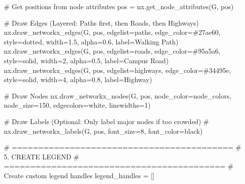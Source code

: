 \documentclass[
  letterpaper,
  DIV=11,
  numbers=noendperiod]{scrreprt}
\newenvironment{Shaded}{\begin{snugshade}}{\end{snugshade}}
\newcommand{\CommentTok}[1]{\textcolor[rgb]{0.37,0.37,0.37}{#1}}
\newcommand{\DecValTok}[1]{\textcolor[rgb]{0.68,0.00,0.00}{#1}}
\newcommand{\FloatTok}[1]{\textcolor[rgb]{0.68,0.00,0.00}{#1}}
\newcommand{\NormalTok}[1]{\textcolor[rgb]{0.00,0.23,0.31}{#1}}
\newcommand{\OperatorTok}[1]{\textcolor[rgb]{0.37,0.37,0.37}{#1}}
\newcommand{\StringTok}[1]{\textcolor[rgb]{0.13,0.47,0.30}{#1}}
\begin{document}
\begin{Shaded}
\begin{Highlighting}[]
\CommentTok{\# Get positions from node attributes}
\NormalTok{pos }\OperatorTok{=}\NormalTok{ nx.get\_node\_attributes(G, }\StringTok{\textquotesingle{}pos\textquotesingle{}}\NormalTok{)}

\CommentTok{\# Draw Edges (Layered: Paths first, then Roads, then Highways)}
\NormalTok{nx.draw\_networkx\_edges(G, pos, edgelist}\OperatorTok{=}\NormalTok{paths, edge\_color}\OperatorTok{=}\StringTok{\textquotesingle{}\#27ae60\textquotesingle{}}\NormalTok{, style}\OperatorTok{=}\StringTok{\textquotesingle{}dotted\textquotesingle{}}\NormalTok{, width}\OperatorTok{=}\FloatTok{1.5}\NormalTok{, alpha}\OperatorTok{=}\FloatTok{0.6}\NormalTok{, label}\OperatorTok{=}\StringTok{\textquotesingle{}Walking Path\textquotesingle{}}\NormalTok{)}
\NormalTok{nx.draw\_networkx\_edges(G, pos, edgelist}\OperatorTok{=}\NormalTok{roads, edge\_color}\OperatorTok{=}\StringTok{\textquotesingle{}\#95a5a6\textquotesingle{}}\NormalTok{, style}\OperatorTok{=}\StringTok{\textquotesingle{}solid\textquotesingle{}}\NormalTok{, width}\OperatorTok{=}\DecValTok{2}\NormalTok{, alpha}\OperatorTok{=}\FloatTok{0.5}\NormalTok{, label}\OperatorTok{=}\StringTok{\textquotesingle{}Campus Road\textquotesingle{}}\NormalTok{)}
\NormalTok{nx.draw\_networkx\_edges(G, pos, edgelist}\OperatorTok{=}\NormalTok{highways, edge\_color}\OperatorTok{=}\StringTok{\textquotesingle{}\#34495e\textquotesingle{}}\NormalTok{, style}\OperatorTok{=}\StringTok{\textquotesingle{}solid\textquotesingle{}}\NormalTok{, width}\OperatorTok{=}\DecValTok{4}\NormalTok{, alpha}\OperatorTok{=}\FloatTok{0.8}\NormalTok{, label}\OperatorTok{=}\StringTok{\textquotesingle{}Highway\textquotesingle{}}\NormalTok{)}

\CommentTok{\# Draw Nodes}
\NormalTok{nx.draw\_networkx\_nodes(G, pos, node\_color}\OperatorTok{=}\NormalTok{node\_colors, node\_size}\OperatorTok{=}\DecValTok{150}\NormalTok{, edgecolors}\OperatorTok{=}\StringTok{\textquotesingle{}white\textquotesingle{}}\NormalTok{, linewidths}\OperatorTok{=}\DecValTok{1}\NormalTok{)}

\CommentTok{\# Draw Labels (Optional: Only label major nodes if too crowded)}
\CommentTok{\# nx.draw\_networkx\_labels(G, pos, font\_size=8, font\_color=\textquotesingle{}black\textquotesingle{}) }

\CommentTok{\# ==========================================}
\CommentTok{\# 5. CREATE LEGEND}
\CommentTok{\# ==========================================}
\CommentTok{\# Create custom legend handles}
\NormalTok{legend\_handles }\OperatorTok{=}\NormalTok{ []}


\end{Highlighting}
\end{Shaded}
\end{document}
